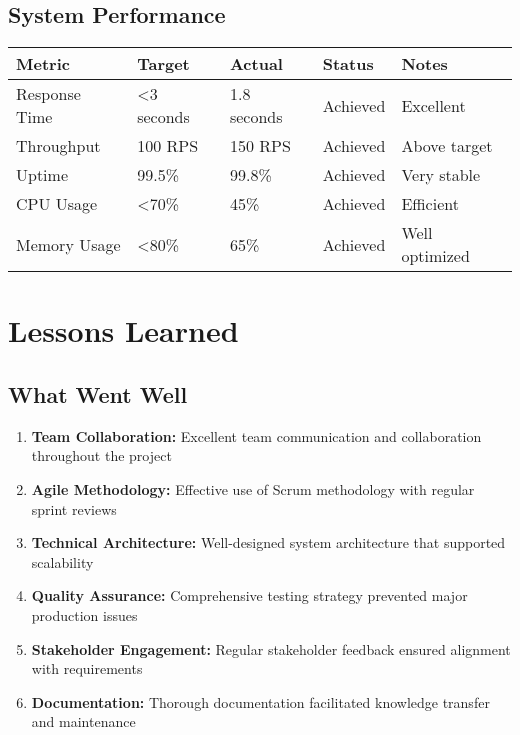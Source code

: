 \documentclass[12pt,a4paper]{article}
\begin{document}
\subsection{System Performance}
\begin{longtable}{|p{4cm}|p{3cm}|p{3cm}|p{3cm}|p{3cm}|}
\hline
\rowcolor{lightgray}
\textbf{Metric} & \textbf{Target} & \textbf{Actual} & \textbf{Status} & \textbf{Notes} \\
\hline
Response Time & <3 seconds & 1.8 seconds & \cellcolor{completedgreen}Achieved & Excellent \\
\hline
Throughput & 100 RPS & 150 RPS & \cellcolor{completedgreen}Achieved & Above target \\
\hline
Uptime & 99.5\% & 99.8\% & \cellcolor{completedgreen}Achieved & Very stable \\
\hline
CPU Usage & <70\% & 45\% & \cellcolor{completedgreen}Achieved & Efficient \\
\hline
Memory Usage & <80\% & 65\% & \cellcolor{completedgreen}Achieved & Well optimized \\
\hline
\end{longtable}

\section{Lessons Learned}

\subsection{What Went Well}
\begin{enumerate}
    \item \textbf{Team Collaboration:} Excellent team communication and collaboration throughout the project
    \item \textbf{Agile Methodology:} Effective use of Scrum methodology with regular sprint reviews
    \item \textbf{Technical Architecture:} Well-designed system architecture that supported scalability
    \item \textbf{Quality Assurance:} Comprehensive testing strategy prevented major production issues
    \item \textbf{Stakeholder Engagement:} Regular stakeholder feedback ensured alignment with requirements
    \item \textbf{Documentation:} Thorough documentation facilitated knowledge transfer and maintenance
\end{enumerate}
\end{document}
